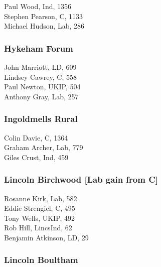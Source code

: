 \documentclass[a4paper,openany,10pt]{book}
\begin{document}


Paul Wood, Ind, 1356\\
Stephen Pearson, C, 1133\\
Michael Hudson, Lab, 286\\


\subsubsection*{Hykeham Forum}



John Marriott, LD, 609\\
Lindsey Cawrey, C, 558\\
Paul Newton, UKIP, 504\\
Anthony Gray, Lab, 257\\


\subsubsection*{Ingoldmells Rural}



Colin Davie, C, 1364\\
Graham Archer, Lab, 779\\
Giles Crust, Ind, 459\\


\subsubsection*{Lincoln Birchwood \hspace*{\fill}\nolinebreak[1]%
\enspace\hspace*{\fill}
[Lab gain from C]}



Rosanne Kirk, Lab, 582\\
Eddie Strengiel, C, 495\\
Tony Wells, UKIP, 492\\
Rob Hill, LincsInd, 62\\
Benjamin Atkinson, LD, 29\\


\subsubsection*{Lincoln Boultham}
\end{document}

